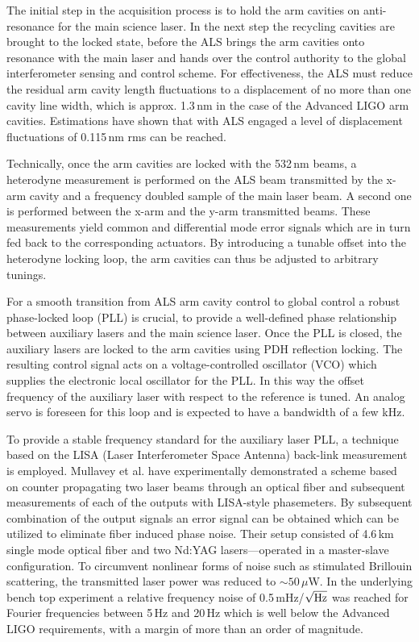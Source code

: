 The initial step in the acquisition process is to hold the arm cavities on anti-resonance for the main science laser. In the next step the 
recycling cavities are brought to the locked state, before the ALS brings the arm cavities onto resonance with the main laser and
hands over the control authority to the global interferometer sensing and control scheme. For effectiveness, the ALS must reduce the residual
arm cavity length fluctuations to a displacement of no more than one cavity line width, which is approx. 1.3\,nm in the case of the
Advanced LIGO arm cavities. Estimations have shown that with ALS engaged a level of displacement fluctuations of 0.115\,nm rms can be 
reached. 

Technically, once the arm cavities are locked with the 532\,nm beams, a heterodyne measurement is performed on the ALS beam transmitted by 
the x-arm cavity and a frequency doubled sample of the main laser beam. A second one is performed between the x-arm and the y-arm transmitted beams. These measurements 
yield common and differential mode error signals which are in turn fed back to the corresponding actuators. By introducing a tunable offset
into the heterodyne locking loop, the arm cavities can thus be adjusted to arbitrary tunings.

For a smooth transition from ALS arm cavity control to global control a robust phase-locked loop (PLL) is crucial, to provide a well-defined phase relationship
between auxiliary lasers and the main science laser. Once the PLL is closed, the auxiliary lasers are locked to the arm cavities using PDH reflection locking. The resulting control signal
acts on a voltage-controlled oscillator (VCO) which supplies the electronic local oscillator for the PLL. In this way the offset frequency of the auxiliary laser with
respect to the reference is tuned. An analog servo is foreseen for this loop and is expected to have a bandwidth of a few kHz.

To provide a stable frequency standard for the auxiliary laser PLL, a technique based on the LISA (Laser Interferometer Space Antenna) back-link measurement is employed. Mullavey et al. \cite{MSSM10}
have experimentally demonstrated a scheme based on counter propagating two laser beams through an optical fiber and subsequent measurements of each of the 
outputs with LISA-style phasemeters. By subsequent combination of the output signals an error signal can be obtained which can be utilized to eliminate fiber induced phase noise. Their setup 
consisted of 4.6\,km single mode optical fiber and two Nd:YAG lasers---operated in a master-slave configuration. To circumvent
nonlinear forms of noise such as stimulated Brillouin scattering, the transmitted laser power was reduced to $\sim50\,\mu$W.
In the underlying bench top experiment a relative frequency noise of 0.5\,mHz/$\sqrt{\textnormal{Hz}}$ was reached for Fourier frequencies between 5\,Hz and 20\,Hz which is
well below the Advanced LIGO requirements, with a margin of more than an order of magnitude.


